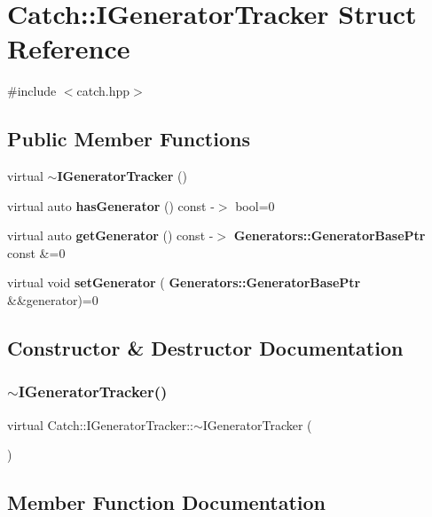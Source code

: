 \section{Catch\+::I\+Generator\+Tracker Struct Reference}
\label{struct_catch_1_1_i_generator_tracker}


{\ttfamily \#include $<$catch.\+hpp$>$}

\subsection*{Public Member Functions}
\begin{DoxyCompactItemize}
\item 
virtual \textbf{ $\sim$\+I\+Generator\+Tracker} ()
\item 
virtual auto \textbf{ has\+Generator} () const -\/$>$ bool=0
\item 
virtual auto \textbf{ get\+Generator} () const -\/$>$ \textbf{ Generators\+::\+Generator\+Base\+Ptr} const \&=0
\item 
virtual void \textbf{ set\+Generator} (\textbf{ Generators\+::\+Generator\+Base\+Ptr} \&\&generator)=0
\end{DoxyCompactItemize}


\subsection{Constructor \& Destructor Documentation}
\mbox{\label{struct_catch_1_1_i_generator_tracker_a20b3c82baa68f821c180d6dac1234eb1}} 
\subsubsection{$\sim$IGeneratorTracker()}
{\footnotesize\ttfamily virtual Catch\+::\+I\+Generator\+Tracker\+::$\sim$\+I\+Generator\+Tracker (\begin{DoxyParamCaption}{ }\end{DoxyParamCaption})\hspace{0.3cm}{\ttfamily [virtual]}}



\subsection{Member Function Documentation}
\mbox{\label{struct_catch_1_1_i_generator_tracker_a23be942fc51672598bfa02c678c3078a}} 
